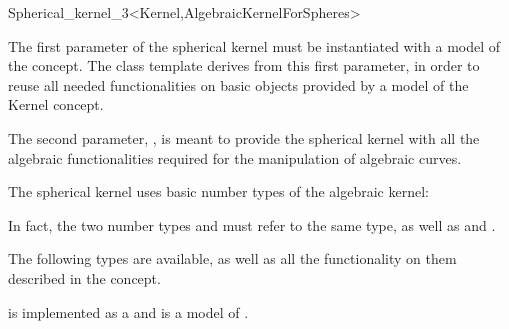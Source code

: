 \begin{ccRefClass}{Spherical_kernel_3<Kernel,AlgebraicKernelForSpheres>}


\ccIsModel


\ccParameters

The first parameter of the spherical kernel must be instantiated with
a model of the  concept. The 
class template derives from this first parameter, in order to reuse
all needed functionalities on basic objects provided by a model of the
Kernel concept. 

The second parameter, , is meant to provide the
spherical kernel with all the algebraic functionalities required for the
manipulation of algebraic curves. 

\ccInheritsFrom


\ccTypes

\ccThreeToTwo

The spherical kernel uses basic number types of the algebraic kernel:

\ccGlue
{}

In fact, the two number types  and
 must refer to the same type, as well as
 and .

The following types are available, as well as all the functionality on
them described in the  concept. 

{}
\ccGlue
{}
\ccGlue
{}

 is implemented as a 
 and is a model 
of .

\ccSeeAlso

\\
\\

\end{ccRefClass}
